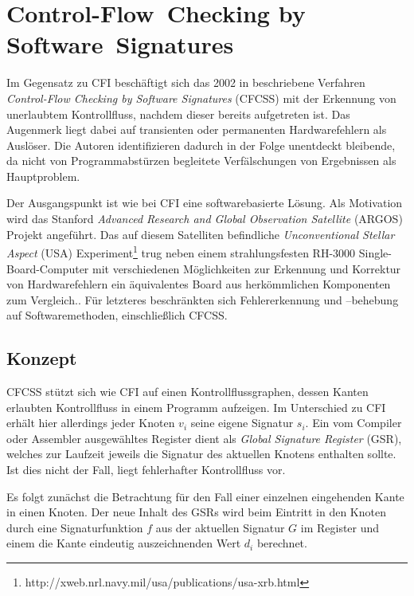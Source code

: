 \documentclass[11pt]{article}
\begin{document}

\section{Control-Flow~Checking by Software~Signatures}

Im Gegensatz zu CFI beschäftigt sich das 2002 in \cite{oh-2002-control}
beschriebene Verfahren \emph{Control-Flow Checking by Software Signatures}
(CFCSS) mit der Erkennung von unerlaubtem Kontrollfluss, nachdem dieser bereits
aufgetreten ist. Das Augenmerk liegt dabei auf transienten oder permanenten
Hardwarefehlern als Auslöser. Die Autoren identifizieren dadurch in der Folge
unentdeckt bleibende, da nicht von Programmabstürzen begleitete Verfälschungen
von Ergebnissen als Hauptproblem.

Der Ausgangspunkt ist wie bei CFI eine softwarebasierte Lösung. Als Motivation
wird das Stanford \emph{Advanced Research and Global Observation Satellite}
(ARGOS) Projekt angeführt. Das auf diesem Satelliten befindliche
\emph{Unconventional Stellar Aspect} (USA)
Experiment\footnote{http://xweb.nrl.navy.mil/usa/publications/usa-xrb.html}
trug neben einem strahlungsfesten RH-3000 Single-Board-Computer mit
verschiedenen Möglichkeiten zur Erkennung und Korrektur von Hardwarefehlern ein
äquivalentes Board aus herkömmlichen Komponenten zum
Vergleich.\cite{argos-2002-lessons}. Für letzteres beschränkten sich
Fehlererkennung und –behebung auf Softwaremethoden, einschließlich CFCSS.

\subsection{Konzept}

CFCSS stützt sich wie CFI auf einen Kontrollflussgraphen, dessen Kanten
erlaubten Kontrollfluss in einem Programm aufzeigen. Im Unterschied zu CFI
erhält hier allerdings jeder Knoten $v_i$ seine eigene Signatur $s_i$. Ein vom
Compiler oder Assembler ausgewähltes Register dient als \emph{Global Signature
Register} (GSR), welches zur Laufzeit jeweils die Signatur des aktuellen
Knotens enthalten sollte. Ist dies nicht der Fall, liegt fehlerhafter
Kontrollfluss vor.

Es folgt zunächst die Betrachtung für den Fall einer einzelnen eingehenden
Kante in einen Knoten. Der neue Inhalt des GSRs wird beim Eintritt in den
Knoten durch eine Signaturfunktion $f$ aus der aktuellen Signatur $G$ im
Register und einem die Kante eindeutig auszeichnenden Wert $d_i$ berechnet.
\end{document}
